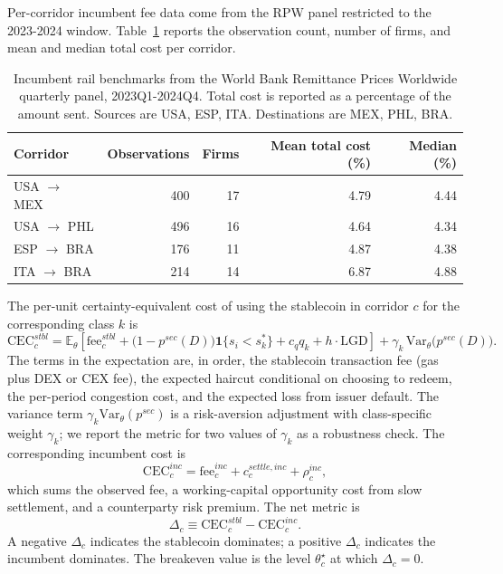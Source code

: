Per-corridor incumbent fee data come from the RPW panel restricted to the 2023-2024 window. Table~\ref{tab:rpw_corridor} reports the observation count, number of firms, and mean and median total cost per corridor.

\begin{table}[h]
\centering
\caption{Incumbent rail benchmarks from the World Bank Remittance Prices Worldwide quarterly panel, 2023Q1-2024Q4. Total cost is reported as a percentage of the amount sent. Sources are USA, ESP, ITA. Destinations are MEX, PHL, BRA.}
\label{tab:rpw_corridor}
\begin{tabular}{lrrrr}
\toprule
Corridor & Observations & Firms & Mean total cost (\%) & Median (\%) \\
\midrule
USA $\to$ MEX & 400 & 17 & 4.79 & 4.44 \\
USA $\to$ PHL & 496 & 16 & 4.64 & 4.34 \\
ESP $\to$ BRA & 176 & 11 & 4.87 & 4.38 \\
ITA $\to$ BRA & 214 & 14 & 6.87 & 4.88 \\
\bottomrule
\end{tabular}
\end{table}

The per-unit certainty-equivalent cost of using the stablecoin in corridor $c$ for the corresponding class $k$ is
\begin{equation}\label{eq:cec_stbl}
\mathrm{CEC}^{stbl}_c = \mathbb{E}_\theta\!\left[\mathrm{fee}_c^{stbl} + \bigl(1 - p^{sec}(D)\bigr) \mathbf{1}\{s_i < s^*_k\} + c_q q_k + h \cdot \mathrm{LGD}\right] + \gamma_k \, \mathrm{Var}_\theta\bigl(p^{sec}(D)\bigr).
\end{equation}
The terms in the expectation are, in order, the stablecoin transaction fee (gas plus DEX or CEX fee), the expected haircut conditional on choosing to redeem, the per-period congestion cost, and the expected loss from issuer default. The variance term $\gamma_k \mathrm{Var}_\theta(p^{sec})$ is a risk-aversion adjustment with class-specific weight $\gamma_k$; we report the metric for two values of $\gamma_k$ as a robustness check. The corresponding incumbent cost is
\begin{equation}\label{eq:cec_inc}
\mathrm{CEC}^{inc}_c = \mathrm{fee}_c^{inc} + c^{settle,inc}_c + \rho_c^{inc},
\end{equation}
which sums the observed fee, a working-capital opportunity cost from slow settlement, and a counterparty risk premium. The net metric is
\begin{equation}\label{eq:net}
\Delta_c \equiv \mathrm{CEC}^{stbl}_c - \mathrm{CEC}^{inc}_c.
\end{equation}
A negative $\Delta_c$ indicates the stablecoin dominates; a positive $\Delta_c$ indicates the incumbent dominates. The breakeven value is the level $\theta^\star_c$ at which $\Delta_c = 0$.


